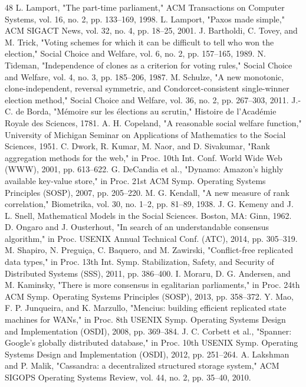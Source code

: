 \documentclass[journal]{IEEEtran}
\begin{document}
\begin{thebibliography}{48}
 L. Lamport, "The part-time parliament," ACM Transactions on Computer Systems, vol. 16, no. 2, pp. 133–169, 1998.
 L. Lamport, "Paxos made simple," ACM SIGACT News, vol. 32, no. 4, pp. 18–25, 2001.
 J. Bartholdi, C. Tovey, and M. Trick, "Voting schemes for which it can be difficult to tell who won the election," Social Choice and Welfare, vol. 6, no. 2, pp. 157–165, 1989.
 N. Tideman, "Independence of clones as a criterion for voting rules," Social Choice and Welfare, vol. 4, no. 3, pp. 185–206, 1987.
 M. Schulze, "A new monotonic, clone-independent, reversal symmetric, and Condorcet-consistent single-winner election method," Social Choice and Welfare, vol. 36, no. 2, pp. 267–303, 2011.
 J.-C. de Borda, "Mémoire sur les élections au scrutin," Histoire de l'Académie Royale des Sciences, 1781.
 A. H. Copeland, "A reasonable social welfare function," University of Michigan Seminar on Applications of Mathematics to the Social Sciences, 1951.
 C. Dwork, R. Kumar, M. Naor, and D. Sivakumar, "Rank aggregation methods for the web," in Proc. 10th Int. Conf. World Wide Web (WWW), 2001, pp. 613–622.
 G. DeCandia et al., "Dynamo: Amazon's highly available key-value store," in Proc. 21st ACM Symp. Operating Systems Principles (SOSP), 2007, pp. 205–220.
 M. G. Kendall, "A new measure of rank correlation," Biometrika, vol. 30, no. 1–2, pp. 81–89, 1938.
 J. G. Kemeny and J. L. Snell, Mathematical Models in the Social Sciences. Boston, MA: Ginn, 1962.
 D. Ongaro and J. Ousterhout, "In search of an understandable consensus algorithm," in Proc. USENIX Annual Technical Conf. (ATC), 2014, pp. 305–319.
 M. Shapiro, N. Preguiça, C. Baquero, and M. Zawirski, "Conflict-free replicated data types," in Proc. 13th Int. Symp. Stabilization, Safety, and Security of Distributed Systems (SSS), 2011, pp. 386–400.
 I. Moraru, D. G. Andersen, and M. Kaminsky, "There is more consensus in egalitarian parliaments," in Proc. 24th ACM Symp. Operating Systems Principles (SOSP), 2013, pp. 358–372.
 Y. Mao, F. P. Junqueira, and K. Marzullo, "Mencius: building efficient replicated state machines for WANs," in Proc. 8th USENIX Symp. Operating Systems Design and Implementation (OSDI), 2008, pp. 369–384.
 J. C. Corbett et al., "Spanner: Google's globally distributed database," in Proc. 10th USENIX Symp. Operating Systems Design and Implementation (OSDI), 2012, pp. 251–264.
 A. Lakshman and P. Malik, "Cassandra: a decentralized structured storage system," ACM SIGOPS Operating Systems Review, vol. 44, no. 2, pp. 35–40, 2010.

\end{thebibliography}
\end{document}
